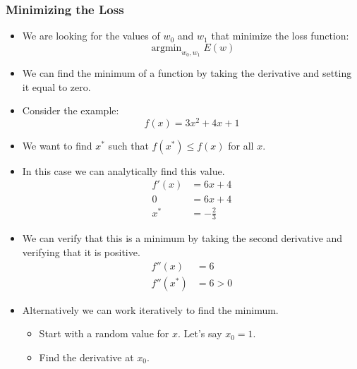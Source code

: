 \documentclass[12pt]{article}
\DeclareMathOperator*{\argmin}{argmin}
\begin{document}
            \subsubsection{Minimizing the Loss}
                \begin{itemize}
                    \item We are looking for the values of $w_0$ and $w_1$ that minimize the loss function:
                    \begin{equation}
                        \argmin_{w_0, w_1} E(w)
                    \end{equation}
                    \item We can find the minimum of a function by taking the derivative and setting it equal to zero.
                    \item Consider the example:
                    \begin{equation}
                        f(x) = 3x^2 + 4x + 1
                    \end{equation}
                    \item We want to find $x^*$ such that $f(x^*) \leq f(x)$ for all $x$.
                    \item In this case we can analytically find this value.
                    \begin{align*}
                        f'(x) &= 6x + 4\\
                        0 &= 6x + 4\\
                        x^* &= -\frac{2}{3}
                    \end{align*}
                    \item We can verify that this is a minimum by taking the second derivative and verifying that it is positive.
                    \begin{align*}
                        f''(x) &= 6\\
                        f''(x^*) &= 6 > 0
                    \end{align*}
                    \item Alternatively we can work iteratively to find the minimum.
                    \begin{itemize}
                        \item Start with a random value for $x$. Let's say $x_0 = 1$.
                        \item Find the derivative at $x_0$.
                        \begin{align*}

\end{align*}
\end{itemize}
\end{itemize}
\end{document}

